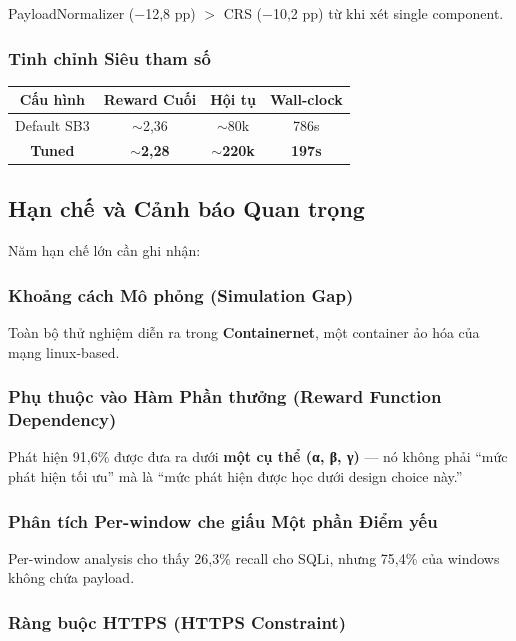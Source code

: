 \documentclass[12pt,a4paper,twoside]{report}
\begin{document}
PayloadNormalizer ($-$12,8 pp) $>$ CRS ($-$10,2 pp) từ khi xét single component.

\subsubsection{Tinh chỉnh Siêu tham số}

\begin{table}[h]
\centering
\begin{tabular}{|c|c|c|c|}
\hline
\textbf{Cấu hình} & \textbf{Reward Cuối} & \textbf{Hội tụ} & \textbf{Wall-clock} \\
\hline
Default SB3 & $\sim$2,36 & $\sim$80k & 786s \\
\textbf{Tuned} & \textbf{$\sim$2,28} & \textbf{$\sim$220k} & \textbf{197s} \\
\hline
\end{tabular}
\end{table}

\subsection{Hạn chế và Cảnh báo Quan trọng}

Năm hạn chế lớn cần ghi nhận:

\subsubsection{Khoảng cách Mô phỏng (Simulation Gap)}

Toàn bộ thử nghiệm diễn ra trong \textbf{Containernet}, một container ảo hóa của mạng linux-based.

\subsubsection{Phụ thuộc vào Hàm Phần thưởng (Reward Function Dependency)}

Phát hiện 91,6\% được đưa ra dưới \textbf{một cụ thể (α, β, γ)} --- nó không phải ``mức phát hiện tối ưu'' mà là ``mức phát hiện được học dưới design choice này.''

\subsubsection{Phân tích Per-window che giấu Một phần Điểm yếu}

Per-window analysis cho thấy 26,3\% recall cho SQLi, nhưng 75,4\% của windows không chứa payload.

\subsubsection{Ràng buộc HTTPS (HTTPS Constraint)}
\end{document}
